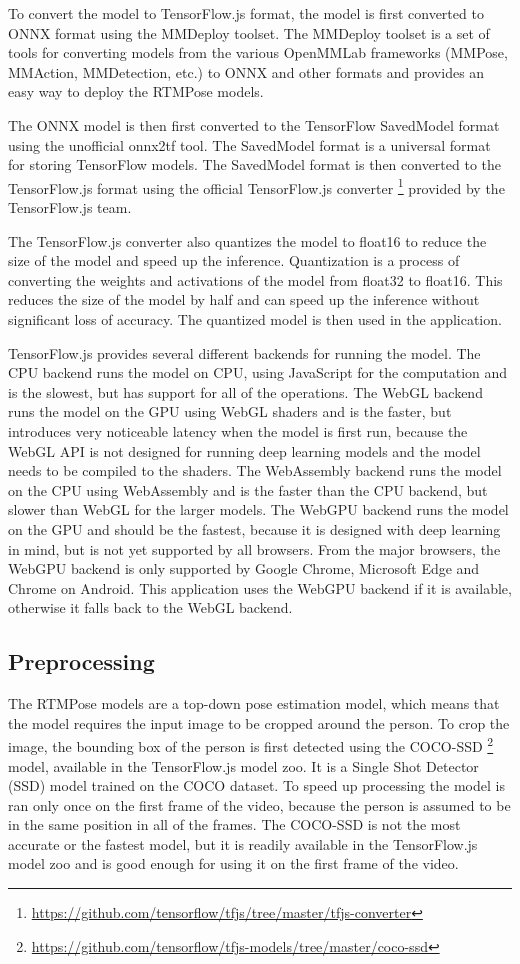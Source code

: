 To convert the model to TensorFlow.js format, the model is first converted to ONNX format using the MMDeploy \cite{mmdeploy} toolset. The MMDeploy toolset is a set of tools for converting models from the various OpenMMLab frameworks (MMPose, MMAction, MMDetection, etc.) to ONNX and other formats and provides an easy way to deploy the RTMPose models.

The ONNX model is then first converted to the TensorFlow SavedModel format using the unofficial onnx2tf \cite{onnx2tf} tool. The SavedModel format is a universal format for storing TensorFlow models. The SavedModel format is then converted to the TensorFlow.js format using the official TensorFlow.js converter \footnote{\url{https://github.com/tensorflow/tfjs/tree/master/tfjs-converter}} provided by the TensorFlow.js team.

The TensorFlow.js converter also quantizes the model to float16 to reduce the size of the model and speed up the inference. Quantization is a process of converting the weights and activations of the model from float32 to float16. This reduces the size of the model by half and can speed up the inference without significant loss of accuracy. The quantized model is then used in the application.

TensorFlow.js provides several different backends for running the model. The CPU backend runs the model on CPU, using JavaScript for the computation and is the slowest, but has support for all of the operations. The WebGL backend runs the model on the GPU using WebGL shaders and is the faster, but introduces very noticeable latency when the model is first run, because the WebGL API is not designed for running deep learning models and the model needs to be compiled to the shaders. The WebAssembly backend runs the model on the CPU using WebAssembly and is the faster than the CPU backend, but slower than WebGL for the larger models. The WebGPU backend runs the model on the GPU and should be the fastest, because it is designed with deep learning in mind, but is not yet supported by all browsers. From the major browsers, the WebGPU backend is only supported by Google Chrome, Microsoft Edge and Chrome on Android. This application uses the WebGPU backend if it is available, otherwise it falls back to the WebGL backend.
\subsection{Preprocessing}
The RTMPose models are a top-down pose estimation model, which means that the model requires the input image to be cropped around the person. To crop the image, the bounding box of the person is first detected using the COCO-SSD \footnote{\url{https://github.com/tensorflow/tfjs-models/tree/master/coco-ssd}} model, available in the TensorFlow.js model zoo. It is a Single Shot Detector (SSD) \cite{ssd} model trained on the COCO \cite{coco} dataset. To speed up processing the model is ran only once on the first frame of the video, because the person is assumed to be in the same position in all of the frames. The COCO-SSD is not the most accurate or the fastest model, but it is readily available in the TensorFlow.js model zoo and is good enough for using it on the first frame of the video.

